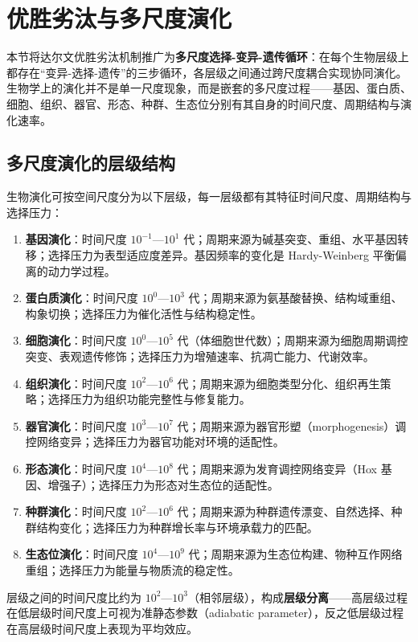\section{优胜劣汰与多尺度演化}

本节将达尔文优胜劣汰机制推广为\textbf{多尺度选择-变异-遗传循环}：在每个生物层级上都存在“变异-选择-遗传”的三步循环，各层级之间通过跨尺度耦合实现协同演化。生物学上的演化并不是单一尺度现象，而是嵌套的多尺度过程——基因、蛋白质、细胞、组织、器官、形态、种群、生态位分别有其自身的时间尺度、周期结构与演化速率。

\subsection{多尺度演化的层级结构}

\begin{definition}[生物演化的层级结构]\label{def:evolution_hierarchy}
生物演化可按空间尺度分为以下层级，每一层级都有其特征时间尺度、周期结构与选择压力：
\begin{enumerate}[label=(\roman*)]
    \item \textbf{基因演化}：时间尺度 $10^{-1}$—$10^1$ 代；周期来源为碱基突变、重组、水平基因转移；选择压力为表型适应度差异。基因频率的变化是 Hardy-Weinberg 平衡偏离的动力学过程。
    \item \textbf{蛋白质演化}：时间尺度 $10^0$—$10^3$ 代；周期来源为氨基酸替换、结构域重组、构象切换；选择压力为催化活性与结构稳定性。
    \item \textbf{细胞演化}：时间尺度 $10^0$—$10^5$ 代（体细胞世代数）；周期来源为细胞周期调控突变、表观遗传修饰；选择压力为增殖速率、抗凋亡能力、代谢效率。
    \item \textbf{组织演化}：时间尺度 $10^2$—$10^6$ 代；周期来源为细胞类型分化、组织再生策略；选择压力为组织功能完整性与修复能力。
    \item \textbf{器官演化}：时间尺度 $10^3$—$10^7$ 代；周期来源为器官形塑（morphogenesis）调控网络变异；选择压力为器官功能对环境的适配性。
    \item \textbf{形态演化}：时间尺度 $10^4$—$10^8$ 代；周期来源为发育调控网络变异（Hox 基因、增强子）；选择压力为形态对生态位的适配性。
    \item \textbf{种群演化}：时间尺度 $10^2$—$10^6$ 代；周期来源为种群遗传漂变、自然选择、种群结构变化；选择压力为种群增长率与环境承载力的匹配。
    \item \textbf{生态位演化}：时间尺度 $10^4$—$10^9$ 代；周期来源为生态位构建、物种互作网络重组；选择压力为能量与物质流的稳定性。
\end{enumerate}
层级之间的时间尺度比约为 $10^2$—$10^3$（相邻层级），构成\textbf{层级分离}——高层级过程在低层级时间尺度上可视为准静态参数（adiabatic parameter），反之低层级过程在高层级时间尺度上表现为平均效应。
\end{definition}

